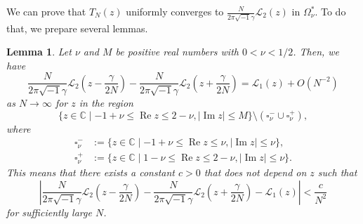 \documentclass[a4paper,dvipdfmx]{amsart}
\theoremstyle{plain}
\newtheorem{lem}[thm]{Lemma}
\theoremstyle{definition}
\theoremstyle{remark}
\newcommand{\C}{\mathbb{C}}
\renewcommand{\L}{\mathcal{L}}
\renewcommand{\Re}{\operatorname{Re}}
\renewcommand{\Im}{\operatorname{Im}}
\renewcommand{\i}{\sqrt{-1}}
\numberwithin{equation}{section}
\begin{document}
\par
We can prove that $T_{N}(z)$ uniformly converges to $\frac{N}{2\pi\i\gamma}\L_2(z)$ in $\Omega^{\ast}_{\nu}$.
To do that, we prepare several lemmas.
\begin{lem}\label{lem:L2_L1_gamma}
Let $\nu$ and $M$ be positive real numbers with $0<\nu<1/2$.
Then, we have
\begin{equation*}
  \frac{N}{2\pi\i\gamma}\L_2\left(z-\frac{\gamma}{2N}\right)
  -
  \frac{N}{2\pi\i\gamma}\L_2\left(z+\frac{\gamma}{2N}\right)
  =
  \L_1(z)
  +
  O(N^{-2})
\end{equation*}
as $N\to\infty$ for $z$ in the region
\begin{equation}\label{eq:L2_L1_approx}
  \{z\in\C\mid-1+\nu\le\Re{z}\le2-\nu,|\Im{z}|\le M\}
  \setminus\left(\square^{-}_{\nu}\cup\square^{+}_{\nu}\right),
\end{equation}
where
\begin{align*}
  \square^{-}_{\nu}
  &:=
  \{z\in\C\mid-1+\nu\le\Re{z}\le\nu,|\Im{z}|\le\nu\},
  \\
  \square^{+}_{\nu}
  &:=
  \{z\in\C\mid1-\nu\le\Re{z}\le2-\nu,|\Im{z}|\le\nu\}.
\end{align*}
This means that there exists a constant $c>0$ that does not depend on $z$ such that
\begin{equation*}
  \left|
    \frac{N}{2\pi\i\gamma}\L_2\left(z-\frac{\gamma}{2N}\right)
    -
    \frac{N}{2\pi\i\gamma}\L_2\left(z+\frac{\gamma}{2N}\right)
    -
    \L_1(z)
  \right|
  <
  \frac{c}{N^2}
\end{equation*}
for sufficiently large $N$.
\end{lem}
\end{document}
